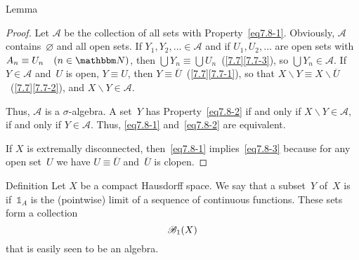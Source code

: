 \documentclass[main.tex]{subfiles}
\begin{document}
%
%
\begin{psec}{7.8}{Lemma}



\end{psec}
\begin{proof}
Let $\mathcal A$ be the collection
of all sets with Property~\eqref{eq7.8-1}.
Obviously, $\mathcal A$ contains~$\varnothing$
and all open sets.
If $Y_1,Y_2,\dotsc \in\mathcal A$
and if $U_1,U_2,\dotsc$ are open sets with $A_n\equiv U_n\quad(n\in\N)$,
then $\bigcup Y_n\equiv \bigcup U_n$~(\ref{7.7}\ref{7.7-3}),
so $\bigcup Y_n\in\mathcal A$.
If $Y\in\mathcal A$ and~$U$ is open,
$Y\equiv U$,
then $Y\equiv \overline U$~(\ref{7.7}\ref{7.7-1}),
so that $X\backslash Y\equiv X\backslash\overline U$~(\ref{7.7}\ref{7.7-2}),
and $X\backslash Y\in\mathcal A$.

Thus, $\mathcal A$ is a $\sigma$-algebra.
A set~$Y$ has Property~\eqref{eq7.8-2}
if and only if $X\backslash Y\in\mathcal A$,
if and only if $Y\in\mathcal A$.
Thus, \eqref{eq7.8-1} and~\eqref{eq7.8-2} are equivalent.

If $X$ is extremally disconnected,
then~\eqref{eq7.8-1} implies~\eqref{eq7.8-3}
because for any open set~$U$
we have $U\equiv\overline U$ and~$\overline U$ is clopen. \xqed
\end{proof}
%
%
\begin{psec}{7.9}{Definition}
Let $X$ be a compact Hausdorff space.
We say that a subset~$Y$ of~$X$ is 
if~$\mathbb{1}_A$ is the (pointwise) limit of a sequence
of continuous functions.
These sets form a collection
\begin{equation*}
\mathscr{B}_1(X)
\end{equation*}
that is easily seen to be an algebra.
\end{psec}
\end{document}
